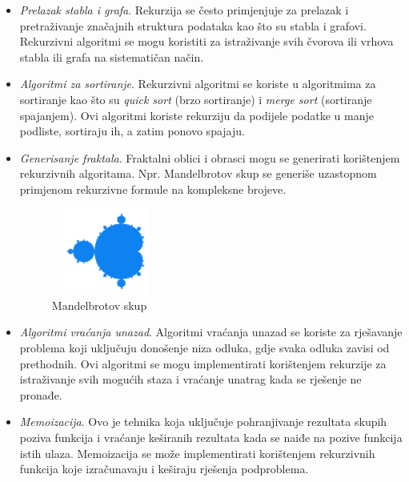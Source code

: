\begin{itemize}
	\item  \textit{Prelazak stabla i grafa}. Rekurzija se često primjenjuje za prelazak i pretraživanje značajnih struktura podataka kao što su stabla i grafovi. Rekurzivni algoritmi se mogu koristiti za istraživanje svih čvorova ili vrhova stabla ili grafa na sistematičan način.
	\item \textit{Algoritmi za sortiranje}. Rekurzivni algoritmi se koriste u algoritmima za sortiranje kao što su \textit{quick sort} (brzo sortiranje) i  \textit{merge sort} (sortiranje spajanjem). Ovi algoritmi koriste rekurziju da podijele podatke u manje podliste, sortiraju ih, a zatim ponovo spajaju.
	\item \textit{Generisanje fraktala}.  Fraktalni oblici i obrasci mogu se generirati korištenjem rekurzivnih algoritama. Npr. Mandelbrotov skup se generiše uzastopnom primjenom rekurzivne formule na kompleksne brojeve.
	
	\begin{figure}
		\centering
		\includegraphics[width=100pt,height=80pt]{slike/mandelbrot.png}
		\caption{ Mandelbrotov skup}
	\end{figure}


	\item \textit{Algoritmi vraćanja unazad}. Algoritmi vraćanja unazad se koriste za rješavanje problema koji uključuju donošenje niza odluka, gdje svaka odluka zavisi od prethodnih. Ovi algoritmi se mogu implementirati korištenjem rekurzije za istraživanje svih mogućih staza i vraćanje unatrag kada se rješenje ne pronađe.
	\item \textit{Memoizacija}.  Ovo je tehnika koja uključuje pohranjivanje rezultata skupih poziva funkcija i vraćanje keširanih rezultata kada se naiđe na pozive funkcija istih ulaza. Memoizacija se može implementirati korištenjem rekurzivnih funkcija koje izračunavaju i keširaju rješenja podproblema.
\end{itemize}

